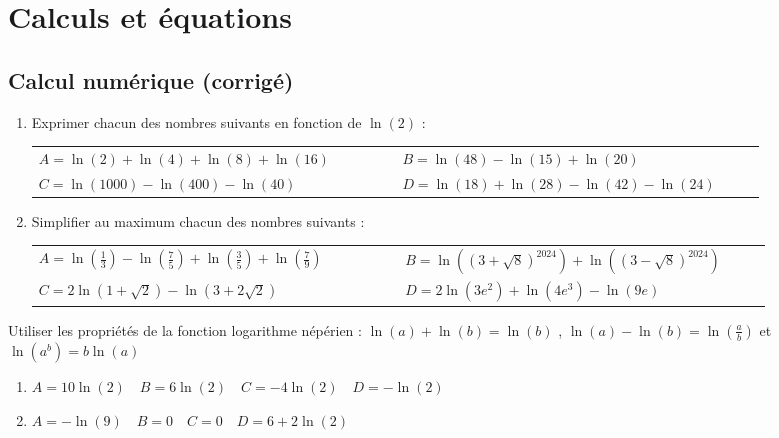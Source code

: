 \documentclass[oneside,12pt]{book}          %
\begin{document}
\section{Calculs et équations}

\subsection{Calcul numérique \quad\small{(corrigé)}} 

\begin{enumerate}
	\item Exprimer chacun des nombres suivants en fonction de $\ln(2)$ :\\
	\renewcommand{\arraystretch}{1.5}
	\begin{tabular}{p{0.45\linewidth}p{0.45\linewidth}}
		$A=\ln(2)+\ln(4)+\ln(8)+\ln(16)$ & $B=\ln(48)-\ln(15)+\ln(20)$\\
		$C=\ln(1000)-\ln(400)-\ln(40)$ & $D=\ln(18)+\ln(28)-\ln(42)-\ln(24)$	\\
	\end{tabular}	
	
	\item Simplifier au maximum chacun des nombres suivants :\\
	\renewcommand{\arraystretch}{1.5}
	\begin{tabular}{p{0.45\linewidth}p{0.45\linewidth}}
		$A=\ln\left(\frac{1}{3}\right)-\ln\left(\frac{7}{5}\right)+\ln\left(\frac{3}{5}\right)+\ln\left(\frac{7}{9}\right)$ & $B=\ln\left((3+\sqrt{8})^{2024}\right)+\ln\left((3-\sqrt{8})^{2024}\right)$ \\
		$C=2\ln\left(1+\sqrt{2}\right)-\ln\left(3+2\sqrt{2}\right)$ & $D=2\ln\left(3e^2\right)+\ln\left(4e^3\right)-\ln(9e)$
	\end{tabular}
\end{enumerate}

\begin{hint}
	Utiliser les propriétés de la fonction logarithme népérien : $\ln(a)+\ln(b)=\ln(b)$ , $\ln(a)-\ln(b)=\ln\left(\frac{a}{b}\right)$ et $\ln\left(a^b\right)=b\ln(a)$
\end{hint}
\begin{sol}
\begin{enumerate}
	\item $A=10\ln(2) \quad B=6\ln(2) \quad C=-4\ln(2) \quad D=-\ln(2)$
	\item $A=-\ln(9) \quad B=0 \quad C=0 \quad D=6+2\ln(2)$ 
\end{enumerate}
\end{sol}
\end{document}
